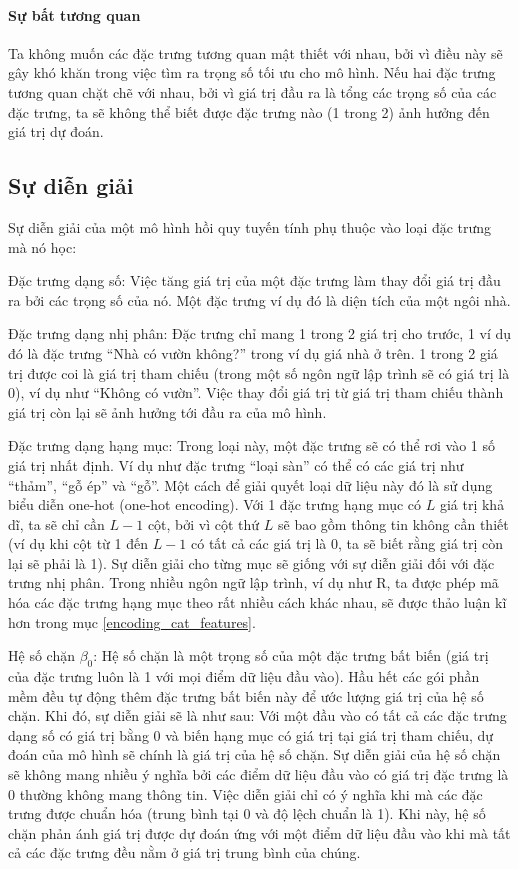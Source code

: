 \paragraph{Sự bất tương quan}
Ta không muốn các đặc trưng tương quan mật thiết với nhau, bởi vì điều này sẽ gây khó khăn trong việc tìm ra trọng số tối ưu cho mô hình. Nếu hai đặc trưng tương quan chặt chẽ với nhau, bởi vì giá trị đầu ra là tổng các trọng số của các đặc trưng, ta sẽ không thể biết được đặc trưng nào (1 trong 2) ảnh hưởng đến giá trị dự đoán.

\subsection{Sự diễn giải}
Sự diễn giải của một mô hình hồi quy tuyến tính phụ thuộc vào loại đặc trưng mà nó học:
\begin{packed_enum}
    \item Đặc trưng dạng số: Việc tăng giá trị của một đặc trưng làm thay đổi giá trị đầu ra bởi các trọng số của nó. Một đặc trưng ví dụ đó là diện tích của một ngôi nhà.
    \item Đặc trưng dạng nhị phân: Đặc trưng chỉ mang 1 trong 2 giá trị cho trước, 1 ví dụ đó là đặc trưng ``Nhà có vườn không?'' trong ví dụ giá nhà ở trên. 1 trong 2 giá trị được coi là giá trị tham chiếu (trong một số ngôn ngữ lập trình sẽ có giá trị là 0), ví dụ như ``Không có vườn''. Việc thay đổi giá trị từ giá trị tham chiếu thành giá trị còn lại sẽ ảnh hưởng tới đầu ra của mô hình.
    \item Đặc trưng dạng hạng mục: Trong loại này, một đặc trưng sẽ có thể rơi vào 1 số giá trị nhất định. Ví dụ như đặc trưng ``loại sàn'' có thể có các giá trị như ``thảm'', ``gỗ ép'' và ``gỗ''. Một cách để giải quyết loại dữ liệu này đó là sử dụng biểu diễn one-hot (one-hot encoding). Với 1 đặc trưng hạng mục có $L$ giá trị khả dĩ, ta sẽ chỉ cần $L-1$ cột, bởi vì cột thứ $L$ sẽ bao gồm thông tin không cần thiết (ví dụ khi cột từ 1 đến $L-1$ có tất cả các giá trị là 0, ta sẽ biết rằng giá trị còn lại sẽ phải là 1). Sự diễn giải cho từng mục sẽ giống với sự diễn giải đối với đặc trưng nhị phân. Trong nhiều ngôn ngữ lập trình, ví dụ như R, ta được phép mã hóa các đặc trưng hạng mục theo rất nhiều cách khác nhau, sẽ được thảo luận kĩ hơn trong mục \ref{encoding_cat_features}.
    \item Hệ số chặn $\beta_0$: Hệ số chặn là một trọng số của một đặc trưng bất biến (giá trị của đặc trưng luôn là 1 với mọi điểm dữ liệu đầu vào). Hầu hết các gói phần mềm đều tự động thêm đặc trưng bất biến này để ước lượng giá trị của hệ số chặn. Khi đó, sự diễn giải sẽ là như sau: Với một đầu vào có tất cả các đặc trưng dạng số có giá trị bằng 0 và biến hạng mục có giá trị tại giá trị tham chiếu, dự đoán của mô hình sẽ chính là giá trị của hệ số chặn. Sự diễn giải của hệ số chặn sẽ không mang nhiều ý nghĩa bởi các điểm dữ liệu đầu vào có giá trị đặc trưng là 0 thường không mang thông tin. Việc diễn giải chỉ có ý nghĩa khi mà các đặc trưng được chuẩn hóa (trung bình tại 0 và độ lệch chuẩn là 1). Khi này, hệ số chặn phản ánh giá trị được dự đoán ứng với một điểm dữ liệu đầu vào khi mà tất cả các đặc trưng đều nằm ở giá trị trung bình của chúng.
    

\end{packed_enum}
